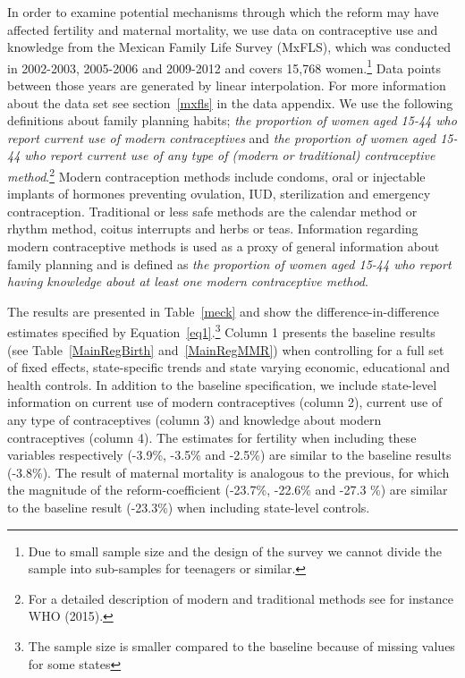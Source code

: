 \documentclass[a4paper, 11pt]{article}
\begin{document}
\begin{spacing}{2}
In order to examine potential mechanisms through which the reform may have affected fertility and maternal mortality, we use data on contraceptive use and knowledge from the Mexican Family Life Survey (MxFLS), which was conducted in 2002-2003, 2005-2006 and 2009-2012 and covers 15,768 women.\footnote{Due to small sample size and the design of the survey we cannot divide the sample into sub-samples for teenagers or similar.} Data points between those years are generated by linear interpolation. For more information about the data set see section~\ref{mxfls} in the data appendix. We use the following definitions about family planning habits; \textit{the proportion of women aged 15-44 who report current use of modern contraceptives} and \textit{the proportion of women aged 15-44 who report current use of any type of (modern or traditional) contraceptive method}.\footnote{For a detailed description of modern and traditional methods see for instance WHO (2015).} Modern contraception methods include condoms, oral or injectable implants of hormones preventing ovulation, IUD, sterilization and emergency contraception. Traditional or less safe methods are the calendar method or rhythm method, coitus interrupts and herbs or teas. Information regarding modern contraceptive methods is used as a proxy of general information about family planning and is defined as \textit{the proportion of women aged 15-44 who report having knowledge about at least one modern contraceptive method}. 



The results are presented in Table~\ref{meck} and show the difference-in-difference estimates specified by Equation~\eqref{eq1}.\footnote{The sample size is smaller compared to the baseline because of missing values for some states} Column 1 presents the baseline results (see Table~\ref{MainRegBirth} and~\ref{MainRegMMR}) when controlling for a full set of fixed effects, state-specific trends and state varying economic, educational and health controls. In addition to the baseline specification, we include state-level information on current use of modern contraceptives (column 2), current use of any type of contraceptives (column 3) and knowledge about modern contraceptives (column 4). The estimates for fertility when including these variables respectively (-3.9\%, -3.5\% and -2.5\%) are similar to the baseline results (-3.8\%). The result of maternal mortality is analogous to the previous, for which the magnitude of the reform-coefficient (-23.7\%, -22.6\% and -27.3 \%) are similar to the baseline result (-23.3\%) when including state-level controls. 



\end{spacing}
\end{document}
